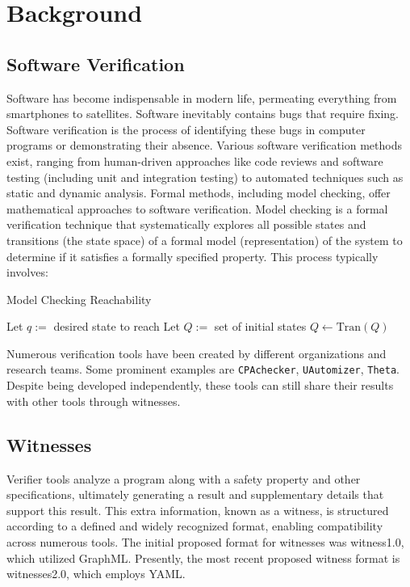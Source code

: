 \chapter{Background}

\section{Software Verification}
Software has become indispensable in modern life, permeating everything from smartphones to 
satellites. Software inevitably contains bugs that require fixing. Software verification is 
the process of identifying these bugs in computer programs or demonstrating their absence. 
Various software verification methods exist, ranging from human-driven approaches like code 
reviews and software testing (including unit and integration testing) to automated techniques 
such as static and dynamic analysis. Formal methods, including model checking, offer mathematical 
approaches to software verification. Model checking is a formal verification technique that 
systematically explores all possible states and transitions (the state space) of a formal model 
(representation) of the system to determine if it satisfies a formally specified property. 
This process typically involves:

\begin{algorithm}
\caption{Model Checking Reachability}
\begin{algorithmic}
\State Let $q :=$ desired state to reach
\State Let $Q :=$ set of initial states
  \State $Q \gets \text{Tran}(Q)$
\EndWhile
\end{algorithmic}
\end{algorithm}


Numerous verification tools have been created by different organizations and research teams. 
Some prominent examples are \texttt{CPAchecker}, \texttt{UAutomizer}, \texttt{Theta}.
Despite being developed independently, these tools can still share their results with other tools
through witnesses.

\section{Witnesses}
Verifier tools analyze a program along with a safety property and other specifications, ultimately
generating a result and supplementary details that support this result. This extra information, 
known as a witness, is structured according to a defined and widely recognized format, enabling 
compatibility across numerous tools. The initial proposed format for witnesses was witness1.0, which 
utilized GraphML. Presently, the most recent proposed witness format is witnesses2.0, which employs YAML.

